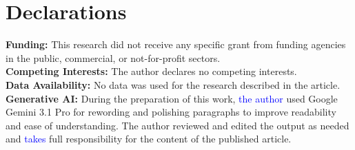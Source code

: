\documentclass[12pt, a4paper]{article}
\newcommand{\revision}[1]{\textcolor{blue}{#1}}
\theoremstyle{break}
\theoremstyle{break}
\theoremstyle{break}
\theoremstyle{break}
\theoremstyle{break}
\theoremstyle{break}
\theoremstyle{break}
\theoremstyle{break}
\theoremstyle{break}
\begin{document}
\section*{Declarations}
\textbf{Funding:} This research did not receive any specific grant from funding agencies in the public, commercial, or not-for-profit sectors. \\
\textbf{Competing Interests:} The author declares no competing interests. \\
\textbf{Data Availability:} No data was used for the research described in the article. \\
\textbf{Generative AI:} During the preparation of this work, \revision{the author} used Google Gemini 3.1 Pro for rewording and polishing paragraphs to improve readability and ease of understanding. The author reviewed and edited the output as needed and \revision{takes} full responsibility for the content of the published article. 



\end{document}
